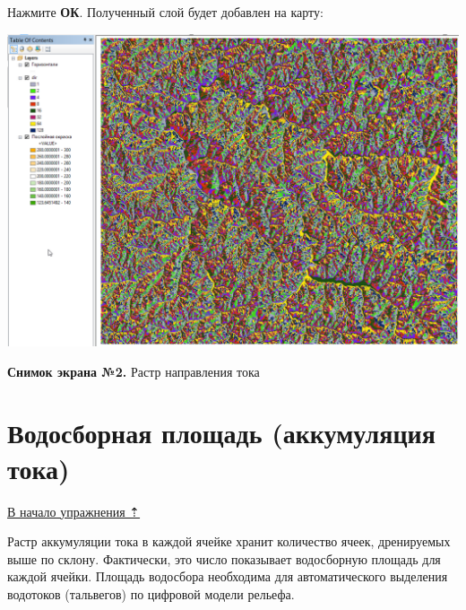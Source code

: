 \documentclass[12pt,]{book}
\begin{document}
Нажмите \textbf{ОК}. Полученный слой будет добавлен на карту:

\includegraphics{images/Ex15/image11.png}

\textbf{Снимок экрана №2.} Растр направления тока

\hypertarget{dem-flowacc}{%
\section{Водосборная площадь (аккумуляция тока)}\label{dem-flowacc}}

\protect\hyperlink{dem}{В начало упражнения ⇡}

Растр аккумуляции тока в каждой ячейке хранит количество ячеек, дренируемых выше по склону. Фактически, это число показывает водосборную площадь для каждой ячейки. Площадь водосбора необходима для автоматического выделения водотоков (тальвегов) по цифровой модели рельефа.
\end{document}
